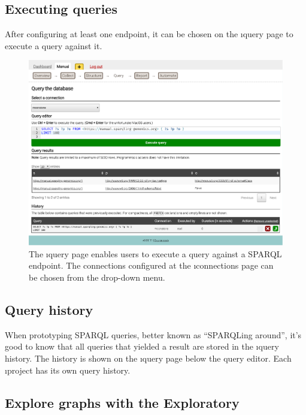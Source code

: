 \subsection{Executing queries}

  After configuring at least one endpoint, it can be chosen on the \i{query}
  page to execute a query against it.

  \begin{figure}[H]
    \begin{center}
      \includegraphics[width=1.0\textwidth]{figures/sg-web-query.pdf}
    \end{center}
    \caption{The \i{query} page enables users to execute a query against a
      SPARQL endpoint.  The connections configured at the \i{connections} page
      can be chosen from the drop-down menu.}
    \label{fig:web-query}
  \end{figure}

\subsection{Query history}
\label{sec:query-history}

  When prototyping SPARQL queries, better known as ``SPARQLing around'', it's
  good to know that all queries that yielded a result are stored in the
  \i{query history}.  The history is shown on the \i{query} page below the
  query editor.  Each \i{project} has its own query history.

\subsection{Explore graphs with the Exploratory}

